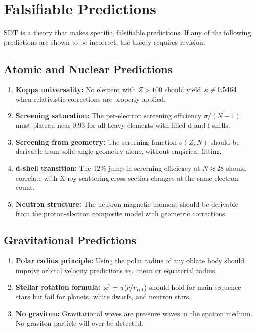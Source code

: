 \chapter{Falsifiable Predictions}
\label{ch:predictions}

SDT is a theory that makes specific, falsifiable predictions. If any of the following predictions are shown to be incorrect, the theory requires revision.

\section{Atomic and Nuclear Predictions}

\begin{enumerate}
  \item \textbf{Koppa universality:} No element with $Z > 100$ should yield $\varkappa \neq 0.5464$ when relativistic corrections are properly applied.
  \item \textbf{Screening saturation:} The per-electron screening efficiency $\sigma/(N{-}1)$ must plateau near $0.93$ for all heavy elements with filled d and f shells.
  \item \textbf{Screening from geometry:} The screening function $\sigma(Z,N)$ should be derivable from solid-angle geometry alone, without empirical fitting.
  \item \textbf{d-shell transition:} The $12\%$ jump in screening efficiency at $N \approx 28$ should correlate with X-ray scattering cross-section changes at the same electron count.
  \item \textbf{Neutron structure:} The neutron magnetic moment should be derivable from the proton-electron composite model with geometric corrections.
\end{enumerate}

\section{Gravitational Predictions}

\begin{enumerate}
  \item \textbf{Polar radius principle:} Using the polar radius of any oblate body should improve orbital velocity predictions vs.\ mean or equatorial radius.
  \item \textbf{Stellar rotation formula:} $\varkappa^2 = \pi(c/v_{\text{rot}})$ should hold for main-sequence stars but fail for planets, white dwarfs, and neutron stars.
  \item \textbf{No graviton:} Gravitational waves are pressure waves in the spation medium. No graviton particle will ever be detected.
\end{enumerate}


